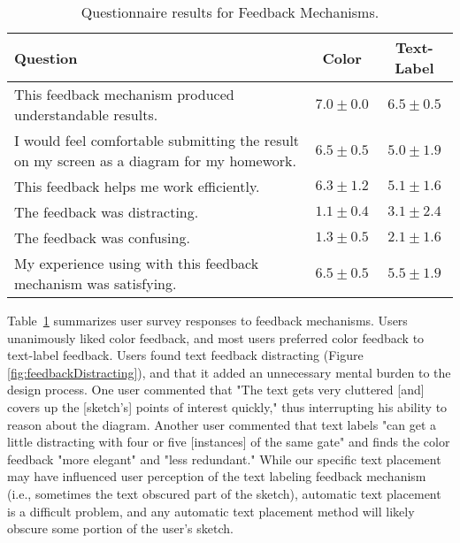 \documentclass{egpubl}
\begin{document}
\begin{table}
  \centering
	\begin{tabular}{|p{.45\linewidth}|c||c|}
	\hline 
  Question 																									& Color & Text-Label \\
  \hline
  This feedback mechanism produced understandable results.	& $7.0\pm0.0$ & $6.5\pm0.5$  \\
  \hline
  I would feel comfortable submitting the result on my screen as a diagram for my homework.
  																													& $6.5\pm0.5$ & $5.0\pm1.9$  \\
  \hline
  This feedback helps me work efficiently.									& $6.3\pm1.2$ & $5.1\pm1.6$  \\
  \hline
  The feedback was distracting.															& $1.1\pm0.4$ & $3.1\pm2.4$  \\
  \hline
  The feedback was confusing.																& $1.3\pm0.5$ & $2.1\pm1.6$  \\
  \hline
  My experience using with this feedback mechanism was satisfying.
  																													& $6.5\pm0.5$ & $5.5\pm1.9$  \\
  \hline
	\end{tabular}
	\caption{Questionnaire results for Feedback Mechanisms.}
	\label{tab:TableC1FeedbackData}
\end{table}


Table~\ref{tab:TableC1FeedbackData} summarizes user survey responses
to feedback mechanisms.  Users unanimously liked color feedback, and
most users preferred color feedback to text-label feedback.  Users
found text feedback distracting (Figure
\ref{fig:feedbackDistracting}), and that it added an unnecessary
mental burden to the design process.  One user commented that "The
text gets very cluttered [and] covers up the [sketch's] points of
interest quickly," thus interrupting his ability to reason about the
diagram.  Another user commented that text labels "can get a little
distracting with four or five [instances] of the same gate" and finds
the color feedback "more elegant" and "less redundant."  While our
specific text placement may have influenced user perception of the
text labeling feedback mechanism (i.e., sometimes the text obscured
part of the sketch), automatic text placement is a difficult problem,
and any automatic text placement method will likely obscure some
portion of the user's sketch.
\end{document}
